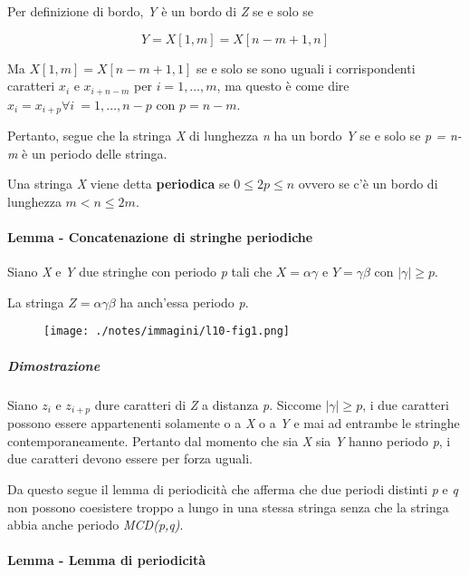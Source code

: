Per definizione di bordo, \emph{Y} è un bordo di \emph{Z} se e solo se

$$
Y = X[1,m]=X[n-m+1,n]
$$

Ma $X[1,m] = X[n-m+1,1]$ se e solo se sono uguali i corrispondenti caratteri $x_i$ e $x_{i+n-m}$ per $i = 1, \ldots, m$, ma questo è come dire $x_i = x_{i+p} \forall i \: = 1,\ldots, n-p $ con $p  = n-m$. 

Pertanto, segue che la stringa \textit{X} di lunghezza \textit{n} ha un bordo \textit{Y} se e solo se \textit{p = n-m} è un periodo delle stringa.

Una stringa \emph{X} viene detta \textbf{periodica} se
$0 \leq 2p \leq n$ ovvero se c'è un bordo di lunghezza
$m  < n \leq 2m$.

\paragraph{Lemma - Concatenazione di stringhe periodiche}\label{lemma---concatenazione-di-stringhe-periodiche}

Siano \emph{X} e \emph{Y} due stringhe con periodo \emph{p} tali che $X = \alpha\gamma$ e $Y = \gamma\beta$ con $|\gamma| \geq p$.

La stringa $Z = \alpha\gamma\beta$ ha anch'essa periodo \emph{p}.

\begin{figure}[htbp]
\centering
\texttt{[image: ./notes/immagini/l10-fig1.png]}
\end{figure}

\subparagraph{Dimostrazione}\label{dimostrazione-1}

Siano $ z_i $ e $ z_{i+p} $ dure caratteri di \textit{Z} a distanza \textit{p}. Siccome $ |\gamma|  \geq p$, i due caratteri possono essere appartenenti solamente o a \textit{X} o a \textit{Y} e mai ad entrambe le stringhe contemporaneamente. 
Pertanto dal momento che sia \textit{X} sia \textit{Y} hanno periodo \textit{p}, i due caratteri devono essere per forza uguali.

Da questo segue il lemma di periodicità che afferma che due periodi distinti \emph{p} e \emph{q} non possono coesistere troppo a lungo in
una stessa stringa senza che la stringa abbia anche periodo \emph{MCD(p,q)}.

\paragraph{Lemma - Lemma di periodicità}\label{lemma---lemma-di-periodicituxe0}

